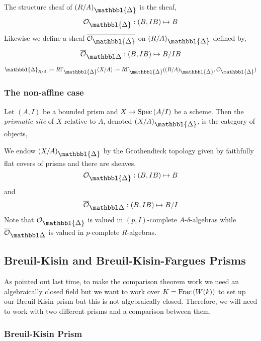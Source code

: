 \documentclass[12pt]{article}
\newcommand{\Prism}{{\mathlarger{\mathbbl{\Delta}}}}
\begin{document}
\begin{defn}
The structure sheaf of $(R/A)_{\Prism}$ is the sheaf,
\[ \struct{\Prism} : (B, IB) \mapsto B \]
Likewise we define a sheaf $\ol{\struct{\Prism}}$ on $(R/A)_{\Prism}$ defined by,
\[ \barOpris : (B, IB) \mapsto B / I B \]
\end{defn}

\begin{defn}
$\Prism_{R/A} := R \Gamma_{\Prism}(X/A) := R \Gamma_{\Prism}((R/A)_{\Prism}, \struct{\Prism})$
\end{defn}

\subsubsection{The non-affine case}


\begin{defn}
Let $(A, I)$ be a bounded prism and $X \to \mathrm{Spec}\left( A/I \right)$ be a scheme. Then the \textit{prismatic site} of $X$ relative to $A$, denoted $(X/A)_{\Prism}$, is the category of objects,
\begin{center}
\end{center}
We endow $(X/A)_{\Prism}$ by the Grothendieck topology given by faithfully flat covers of prisms and there are sheaves,
\[ \struct{\Prism} : (B, IB) \mapsto B \]
and 
\[ \barOpris : (B, IB) \mapsto B/I \]
Note that $\struct{\Prism}$ is valued in $(p,I)$-complete $A$-$\delta$-algebras while $\barOpris$ is valued in $p$-complete $R$-algebras.
\end{defn}

\subsection{Breuil-Kisin and Breuil-Kisin-Fargues Prisms}

As pointed out last time, to make the \etale comparison theorem work we need an algebraically closed field but we want to work over $K = \mathrm{Frac}\left(W(k)\right)$ to set up our Breuil-Kisin prism but this is not algebraically closed. Therefore, we will need to work with two different prisms and a comparison between them.

\subsubsection{Breuil-Kisin Prism}
\end{document}
